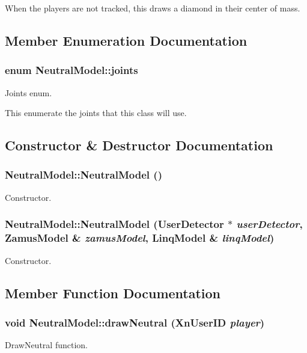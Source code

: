 When the players are not tracked, this draws a diamond in their center of mass. 

\subsection{Member Enumeration Documentation}
\hypertarget{classNeutralModel_ae6dcf993ce557c9d12b4f647a9315402}{
\subsubsection[{joints}]{\setlength{\rightskip}{0pt plus 5cm}enum {\bf NeutralModel::joints}}}
\label{classNeutralModel_ae6dcf993ce557c9d12b4f647a9315402}
Joints enum.

This enumerate the joints that this class will use. 

\subsection{Constructor \& Destructor Documentation}
\hypertarget{classNeutralModel_acc468e49cc6ccad440a869d3e3dfbef9}{
\subsubsection[{NeutralModel}]{\setlength{\rightskip}{0pt plus 5cm}NeutralModel::NeutralModel ()}}
\label{classNeutralModel_acc468e49cc6ccad440a869d3e3dfbef9}
Constructor. \hypertarget{classNeutralModel_a4de591c21128f7fe002aae39d38e2aaf}{
\subsubsection[{NeutralModel}]{\setlength{\rightskip}{0pt plus 5cm}NeutralModel::NeutralModel ({\bf UserDetector} $\ast$ {\em userDetector}, \/  {\bf ZamusModel} \& {\em zamusModel}, \/  {\bf LinqModel} \& {\em linqModel})}}
\label{classNeutralModel_a4de591c21128f7fe002aae39d38e2aaf}
Constructor. 

\subsection{Member Function Documentation}
\hypertarget{classNeutralModel_a5a43982c4fa91e7a0751307b190b9900}{
\subsubsection[{drawNeutral}]{\setlength{\rightskip}{0pt plus 5cm}void NeutralModel::drawNeutral (XnUserID {\em player})}}
\label{classNeutralModel_a5a43982c4fa91e7a0751307b190b9900}
DrawNeutral function.

